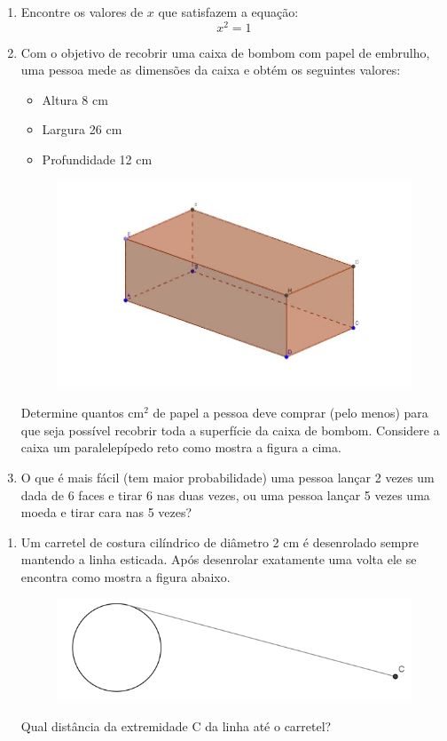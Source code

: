 \documentclass[a4paper,11pt,oneside,brazilian]{article}
\begin{document}
\begin{enumerate}[{B}1]
  \item Encontre os valores de \(x\) que satisfazem a equação: \[x^2 = 1\]
  \item Com o objetivo de recobrir uma caixa de bombom com papel de embrulho, 
  uma pessoa mede as dimensões da caixa e obtém os seguintes valores:
  \begin{itemize}
    \item Altura 8 cm
    \item Largura 26 cm
    \item Profundidade 12 cm
  \end{itemize}
  \begin{figure}[H]
	\centering
	\includegraphics[width=0.9\columnwidth]{prismaretoretangulo.jpg}
	\label{fig:prismaretoretangulo}
	\end{figure}
	
	Determine quantos cm$^2$ de papel a pessoa deve comprar (pelo menos) para que
	seja possível recobrir toda a superfície da caixa de bombom. Considere a caixa
	um paralelepípedo reto como mostra a figura a cima.
	
  \item O que é mais fácil (tem maior probabilidade) uma pessoa lançar 2 vezes
  um dada de 6 faces e tirar 6 nas duas vezes, ou uma pessoa lançar 5 vezes uma
  moeda e tirar cara nas 5 vezes?
	
	
\end{enumerate}
\begin{enumerate}[{C}1]
  \item Um carretel de costura cilíndrico de diâmetro 2 cm é desenrolado sempre
  mantendo a linha esticada. Após desenrolar exatamente uma volta ele se encontra como mostra a figura abaixo.
  \begin{figure}[H]
	\centering
	\includegraphics[width=0.9\columnwidth]{carretel.png}
	\label{fig:carretel}
	\end{figure}
  Qual distância da extremidade C da linha até o carretel?
  
\end{enumerate}
\end{document}
